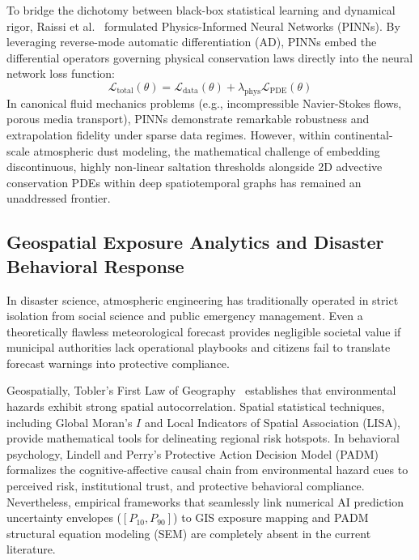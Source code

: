 To bridge the dichotomy between black-box statistical learning and dynamical rigor, Raissi et al.~\cite{raissi2019physics} formulated Physics-Informed Neural Networks (PINNs). By leveraging reverse-mode automatic differentiation (AD), PINNs embed the differential operators governing physical conservation laws directly into the neural network loss function:
\begin{equation}
\label{eq:pinn_loss_intro}
\mathcal{L}_{\text{total}}(\theta) = \mathcal{L}_{\text{data}}(\theta) + \lambda_{\text{phys}} \mathcal{L}_{\text{PDE}}(\theta)
\end{equation}
In canonical fluid mechanics problems (e.g., incompressible Navier-Stokes flows, porous media transport), PINNs demonstrate remarkable robustness and extrapolation fidelity under sparse data regimes. However, within continental-scale atmospheric dust modeling, the mathematical challenge of embedding discontinuous, highly non-linear saltation thresholds alongside 2D advective conservation PDEs within deep spatiotemporal graphs has remained an unaddressed frontier.

\subsection{Geospatial Exposure Analytics and Disaster Behavioral Response}
\label{subsec:socio_progress}

In disaster science, atmospheric engineering has traditionally operated in strict isolation from social science and public emergency management. Even a theoretically flawless meteorological forecast provides negligible societal value if municipal authorities lack operational playbooks and citizens fail to translate forecast warnings into protective compliance.

Geospatially, Tobler's First Law of Geography~\cite{tobler1970cellular} establishes that environmental hazards exhibit strong spatial autocorrelation. Spatial statistical techniques, including Global Moran's $I$ and Local Indicators of Spatial Association (LISA), provide mathematical tools for delineating regional risk hotspots. In behavioral psychology, Lindell and Perry's Protective Action Decision Model (PADM)~\cite{lindell2012protective} formalizes the cognitive-affective causal chain from environmental hazard cues to perceived risk, institutional trust, and protective behavioral compliance. Nevertheless, empirical frameworks that seamlessly link numerical AI prediction uncertainty envelopes ($[P_{10}, P_{90}]$) to GIS exposure mapping and PADM structural equation modeling (SEM) are completely absent in the current literature.

